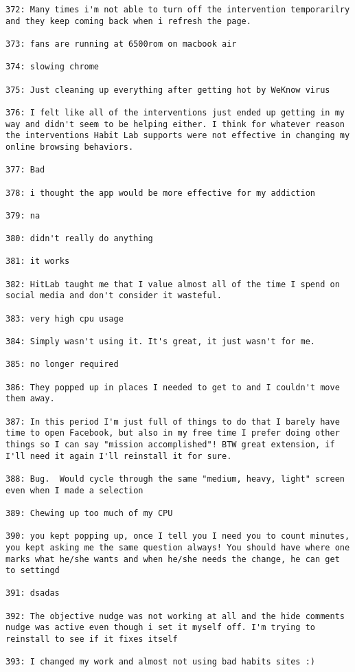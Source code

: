 \begin{lstlisting}[breaklines]
372: Many times i'm not able to turn off the intervention temporarilry and they keep coming back when i refresh the page.

373: fans are running at 6500rom on macbook air

374: slowing chrome

375: Just cleaning up everything after getting hot by WeKnow virus

376: I felt like all of the interventions just ended up getting in my way and didn't seem to be helping either. I think for whatever reason the interventions Habit Lab supports were not effective in changing my online browsing behaviors.

377: Bad

378: i thought the app would be more effective for my addiction

379: na

380: didn't really do anything

381: it works

382: HitLab taught me that I value almost all of the time I spend on social media and don't consider it wasteful.

383: very high cpu usage

384: Simply wasn't using it. It's great, it just wasn't for me.

385: no longer required

386: They popped up in places I needed to get to and I couldn't move them away.

387: In this period I'm just full of things to do that I barely have time to open Facebook, but also in my free time I prefer doing other things so I can say "mission accomplished"! BTW great extension, if I'll need it again I'll reinstall it for sure.

388: Bug.  Would cycle through the same "medium, heavy, light" screen even when I made a selection

389: Chewing up too much of my CPU

390: you kept popping up, once I tell you I need you to count minutes, you kept asking me the same question always! You should have where one marks what he/she wants and when he/she needs the change, he can get to settingd

391: dsadas

392: The objective nudge was not working at all and the hide comments nudge was active even though i set it myself off. I'm trying to reinstall to see if it fixes itself

393: I changed my work and almost not using bad habits sites :)


\end{lstlisting}
